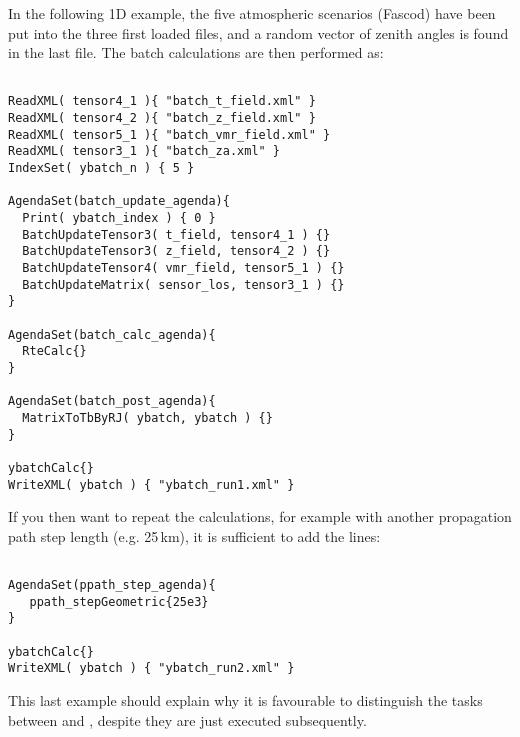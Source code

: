 In the following 1D example, the five atmospheric scenarios (Fascod)
have been put into the three first loaded files, and a random vector
of zenith angles is found in the last file. The batch calculations
are then performed as:
\begin{verbatim}

ReadXML( tensor4_1 ){ "batch_t_field.xml" }
ReadXML( tensor4_2 ){ "batch_z_field.xml" }
ReadXML( tensor5_1 ){ "batch_vmr_field.xml" }
ReadXML( tensor3_1 ){ "batch_za.xml" }
IndexSet( ybatch_n ) { 5 }

AgendaSet(batch_update_agenda){
  Print( ybatch_index ) { 0 }
  BatchUpdateTensor3( t_field, tensor4_1 ) {}
  BatchUpdateTensor3( z_field, tensor4_2 ) {}
  BatchUpdateTensor4( vmr_field, tensor5_1 ) {}
  BatchUpdateMatrix( sensor_los, tensor3_1 ) {}
}

AgendaSet(batch_calc_agenda){
  RteCalc{}
}

AgendaSet(batch_post_agenda){
  MatrixToTbByRJ( ybatch, ybatch ) {}
}

ybatchCalc{}
WriteXML( ybatch ) { "ybatch_run1.xml" }

\end{verbatim}
If you then want to repeat the calculations, for example with another
propagation path step length (e.g. 25\,km), it is sufficient to add
the lines:
\begin{verbatim}

AgendaSet(ppath_step_agenda){
   ppath_stepGeometric{25e3}
}

ybatchCalc{}
WriteXML( ybatch ) { "ybatch_run2.xml" }

\end{verbatim}
This last example should explain why it is favourable to distinguish
the tasks between  and
, despite they are just executed
subsequently.



